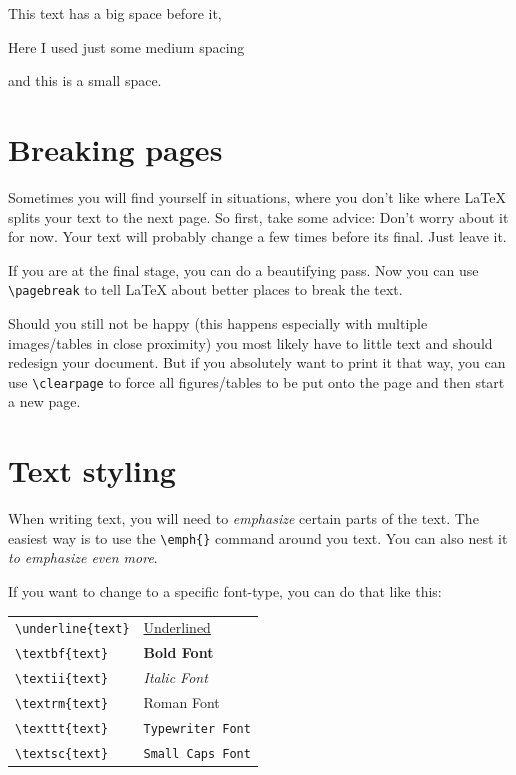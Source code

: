 \documentclass[	%
		fontsize=11pt,  %
		a4paper,	    %
		english,		%
		sans,			%
		f1,				%
	]{HsH-report}		%
\begin{document}
		\bigskip
		This text has a big space before it,

		\medskip
		Here I used just some medium spacing

		\smallskip
		and this is a small space.

	\section{Breaking pages} \label{sec: pagebreak}
		Sometimes you will find yourself in situations, where you don't like where LaTeX splits your text to the next page. So first, take some
		advice: Don't worry about it for now. Your text will probably change a few times before its final. Just leave it.

		If you are at the final stage, you can do a beautifying pass. Now you can use \lstinline|\pagebreak| to tell LaTeX about better places to
		break the text.

		Should you still not be happy (this happens especially with multiple images/tables in close proximity) you most likely have to little text and
		should redesign your document. But if you absolutely want to print it that way, you can use \lstinline|\clearpage| to force all
		figures/tables to be put onto the page and then start a new page.

	\section{Text styling} \label{sec: styling}
		When writing text, you will need to \emph{emphasize} certain parts of the text. The easiest way is to use the \lstinline|\emph{}| command
		around you text. You can also nest it \emph{to \emph{emphasize} even more}.

		If you want to change to a specific font-type, you can do that like this:

		\smallskip
		\begin{tabular}{l l}
			\lstinline|\underline{text}| & \underline{Underlined} \\
			\lstinline|\textbf{text}| & \textbf{Bold Font} \\
			\lstinline|\textii{text}| & \textit{Italic Font} \\
			\lstinline|\textrm{text}| & \textrm{Roman Font} \\
			\lstinline|\texttt{text}| & \texttt{Typewriter Font} \\
			\lstinline|\textsc{text}| & \texttt{Small Caps Font} \\
		\end{tabular}
\end{document}
